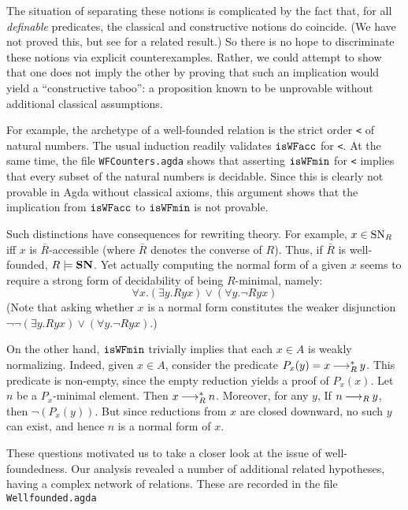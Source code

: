 The situation of separating these notions is complicated by the fact that, for all
\emph{definable} predicates, the classical and constructive notions do coincide.
(We have not proved this, but see \cite{Berardi} for a related result.)
So there is no hope to discriminate these notions via explicit counterexamples.
Rather, we could attempt to show that one does not imply the other by proving that
such an implication would yield a ``constructive taboo'': a proposition known to be
unprovable without additional classical assumptions.

For example, the archetype of a well-founded relation is the strict order \verb|<|
of natural numbers.  The usual induction readily validates $\mathtt{isWFacc}$ for \verb|<|.
  At the same time, the file \texttt{WFCounters.agda} shows that
asserting $\mathtt{isWFmin}$ for \verb|<| implies that every subset of the natural numbers is decidable.  Since this is clearly not provable in Agda without classical axioms,
this argument shows that the implication from $\mathtt{isWFacc}$ to $\mathtt{isWFmin}$ is not provable.

Such distinctions have consequences for rewriting theory.
For example, $x\in \mathrm{SN}_R$ iff $x$ is $\bar{R}$-accessible (where $\bar{R}$ denotes
the converse of $R$).  Thus, if $\bar{R}$ is well-founded, $R \models \mathbf{SN}$.
Yet actually computing the normal form of a given $x$ seems to require a
strong form of decidability of being $R$-minimal, namely:
\[
\tag{$\isMinDec$} \forall x. \left(\exists y. Ryx\right) \lor \left(\forall y. \lnot Ryx\right)
\]
(Note that asking whether $x$ is a normal form constitutes the weaker disjunction
$\lnot\lnot\left(\exists y. Ryx\right) \lor \left(\forall y. \lnot Ryx\right)$.)

On the other hand, $\mathtt{isWFmin}$ trivially implies that each $x \in A$ is weakly normalizing.
Indeed, given $x \in A$, consider the predicate $P_x(y) = x \mathbin{\longrightarrow_R^*} y$.
This predicate is non-empty, since the empty reduction yields a proof of $P_x(x)$.
Let $n$ be a $P_x$-minimal element.  Then $x \mathbin{\longrightarrow_R^*} n$.  Moreover, for any $y$,
If $n \mathbin{\longrightarrow_R} y$, then $\lnot(P_x(y))$.  But since reductions from $x$ are closed downward,
no such $y$ can exist, and hence $n$ is a normal form of $x$.

%
These questions motivated us to take a closer look at the issue of well-foundedness.
Our analysis revealed a number of additional related hypotheses, having a complex
network of relations.  %
These are recorded in the file \verb|Wellfounded.agda|
